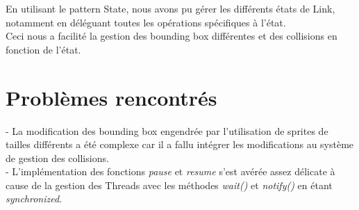 En utilisant le pattern State, nous avons pu gérer les différents états de Link,
notamment en déléguant toutes les opérations spécifiques à l'état.\\
Ceci nous a facilité la gestion des bounding box différentes et des collisions
en fonction de l'état.


\section{Problèmes rencontrés}
- La modification des bounding box engendrée par l'utilisation de sprites de
tailles différents a été complexe car il a fallu intégrer les modifications au
système de gestion des collisions.\\

- L'implémentation des fonctions \emph{pause} et \emph{resume} s'est avérée
assez délicate à cause de la gestion des Threads avec les méthodes \emph{wait()} et
\emph{notify()} en étant \emph{synchronized}.
